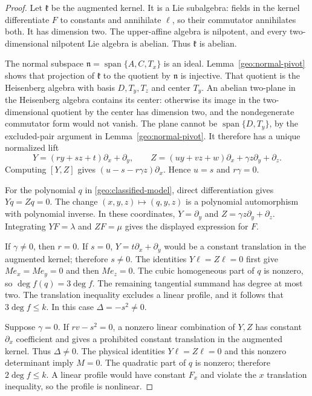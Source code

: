 \documentclass[11pt]{amsart}
\theoremstyle{definition}
\theoremstyle{remark}
\numberwithin{equation}{section}
\begin{document}
\begin{proof}
Let $\mathfrak k$ be the augmented kernel. It is a Lie subalgebra: fields in the kernel differentiate $F$ to constants and annihilate $\ell$, so their commutator annihilates both. It has dimension two. The upper-affine algebra is nilpotent, and every two-dimensional nilpotent Lie algebra is abelian. Thus $\mathfrak k$ is abelian.

The normal subspace $\mathfrak n=\operatorname{span}\{A,C,T_x\}$ is an ideal. Lemma~\ref{geo:normal-pivot} shows that projection of $\mathfrak k$ to the quotient by $\mathfrak n$ is injective. That quotient is the Heisenberg algebra with basis $D,T_y,T_z$ and center $T_y$. An abelian two-plane in the Heisenberg algebra contains its center: otherwise its image in the two-dimensional quotient by the center has dimension two, and the nondegenerate commutator form would not vanish. The plane cannot be $\operatorname{span}\{D,T_y\}$, by the excluded-pair argument in Lemma~\ref{geo:normal-pivot}. It therefore has a unique normalized lift
\[
Y=(ry+sz+t)\partial_x+\partial_y,\qquad Z=(uy+vz+w)\partial_x+\gamma z\partial_y+\partial_z.
\]
Computing $[Y,Z]$ gives $(u-s-r\gamma z)\partial_x$. Hence $u=s$ and $r\gamma=0$.

For the polynomial $q$ in \eqref{geo:classified-model}, direct differentiation gives $Yq=Zq=0$. The change $(x,y,z)\mapsto(q,y,z)$ is a polynomial automorphism with polynomial inverse. In these coordinates, $Y=\partial_y$ and $Z=\gamma z\partial_y+\partial_z$. Integrating $YF=\lambda$ and $ZF=\mu$ gives the displayed expression for $F$.

If $\gamma\ne0$, then $r=0$. If $s=0$, $Y=t\partial_x+\partial_y$ would be a constant translation in the augmented kernel; therefore $s\ne0$. The identities $Y\ell=Z\ell=0$ first give $Me_x=Me_y=0$ and then $Me_z=0$. The cubic homogeneous part of $q$ is nonzero, so $\deg f(q)=3\deg f$. The remaining tangential summand has degree at most two. The translation inequality excludes a linear profile, and it follows that $3\deg f\le k$. In this case $\Delta=-s^2\ne0$.

Suppose $\gamma=0$. If $rv-s^2=0$, a nonzero linear combination of $Y,Z$ has constant $\partial_x$ coefficient and gives a prohibited constant translation in the augmented kernel. Thus $\Delta\ne0$. The physical identities $Y\ell=Z\ell=0$ and this nonzero determinant imply $M=0$. The quadratic part of $q$ is nonzero; therefore $2\deg f\le k$. A linear profile would have constant $F_x$ and violate the $x$ translation inequality, so the profile is nonlinear.


\end{proof}
\end{document}
